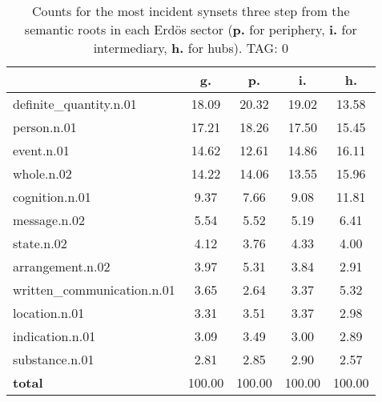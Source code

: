 \begin{table}[h!]
\begin{center}
\begin{tabular}{| l | c | c | c | c |}\hline
 & g. & p. & i. & h. \\\hline
definite\_quantity.n.01 & 18.09  & 20.32  & 19.02  & 13.58 \\\hline
person.n.01 & 17.21  & 18.26  & 17.50  & 15.45 \\\hline
event.n.01 & 14.62  & 12.61  & 14.86  & 16.11 \\\hline
whole.n.02 & 14.22  & 14.06  & 13.55  & 15.96 \\\hline
cognition.n.01 & 9.37  & 7.66  & 9.08  & 11.81 \\\hline
message.n.02 & 5.54  & 5.52  & 5.19  & 6.41 \\\hline
state.n.02 & 4.12  & 3.76  & 4.33  & 4.00 \\\hline
arrangement.n.02 & 3.97  & 5.31  & 3.84  & 2.91 \\\hline
written\_communication.n.01 & 3.65  & 2.64  & 3.37  & 5.32 \\\hline
location.n.01 & 3.31  & 3.51  & 3.37  & 2.98 \\\hline
indication.n.01 & 3.09  & 3.49  & 3.00  & 2.89 \\\hline
substance.n.01 & 2.81  & 2.85  & 2.90  & 2.57 \\\hline
{{\bf total}} & 100.00  & 100.00  & 100.00  & 100.00 \\\hline
\end{tabular}
\caption{Counts for the most incident synsets three step from the semantic roots in each Erd\"os sector ({\bf p.} for periphery, {\bf i.} for intermediary, {\bf h.} for hubs). TAG: 0}
\end{center}
\end{table}
